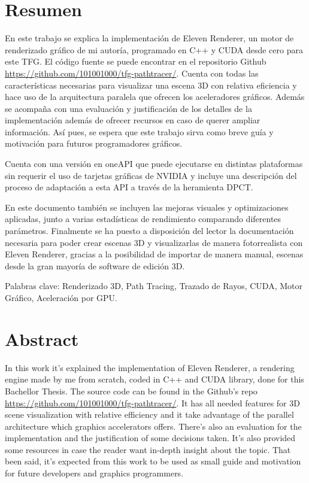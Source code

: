 \chapter*{Resumen}

En este trabajo se explica la implementación de Eleven Renderer, un motor de renderizado gráfico de mi autoría, programado en C++ y CUDA desde cero para este TFG. El código fuente se puede encontrar en el repositorio Github \url{https://github.com/101001000/tfg-pathtracer/}. Cuenta con todas las características necesarias para visualizar una escena 3D con relativa eficiencia y hace uso de la arquitectura paralela que ofrecen los aceleradores gráficos. Además se acompaña con una evaluación y justificación de los detalles de la implementación además de ofrecer recursos en caso de querer ampliar información. Así pues, se espera que este trabajo sirva como breve guía y motivación para futuros programadores gráficos.

Cuenta con una versión en oneAPI que puede ejecutarse en distintas plataformas sin requerir el uso de tarjetas gráficas de NVIDIA y incluye una descripción del proceso de adaptación a esta API a través de la heramienta DPCT.

En este documento también se incluyen las mejoras visuales y optimizaciones aplicadas, junto a varias estadísticas de rendimiento comparando diferentes parámetros. Finalmente se ha puesto a disposición del lector la documentación necesaria para poder crear escenas 3D y visualizarlas de manera fotorrealista con Eleven Renderer, gracias a la posibilidad de importar de manera manual, escenas desde la gran mayoría de software de edición 3D. 

Palabras clave: Renderizado 3D, Path Tracing, Trazado de Rayos, CUDA, Motor Gráfico, Aceleración por GPU.

\chapter*{Abstract}

In this work it's explained the implementation of Eleven Renderer, a rendering engine made by me from scratch, coded in C++ and CUDA library, done for this Bachellor Thesis. The source code can be found in the Github's repo \url{https://github.com/101001000/tfg-pathtracer/}. It has all needed features for 3D scene visualization with relative efficiency and it take advantage of the parallel architecture which graphics accelerators offers. There's also an evaluation for the implementation and the justification of some decisions taken. It's also provided some resources in case the reader want in-depth insight about the topic. That been said, it's expected from this work to be used as small guide and motivation for future developers and graphics programmers.

